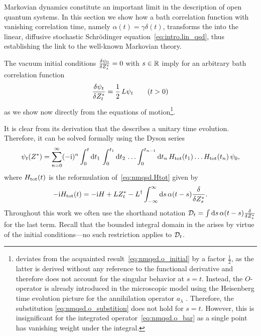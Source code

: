 Markovian dynamics constitute an important limit in the description of open quantum systems.
In this section we show how a bath correlation function with vanishing correlation time, namely $\alpha(t) = \gamma\delta(t)$, transforms the \NMSSE into the linear, diffusive stochastic Schrödinger equation~\ref{eq:intro.lin_qsd}, thus establishing the link to the well-known Markovian theory.

The vacuum initial conditions $\frac{\delta \psi_0}{\delta {Z}^*_s} = 0$ with $s \in \mathbb{R}$ imply for an arbitrary bath correlation function
\begin{equation}
  \frac{\delta \psi_t}{\delta {Z}^*_t} = \frac{1}{2} \, L \psi_t \qquad (t > 0)
  \label{eq:nmqsd.deriv_psit}
\end{equation}
as we show now directly from the equations of motion\footnote{%
   deviates from the acquainted result~\ref{eq:nmqsd.o_initial} by a factor $\frac{1}{2}$, as the latter is derived without any reference to the functional derivative and therefore does not account for the singular behavior at $s=t$.
  Instead, the $O$-operator is already introduced in the microscopic model using the Heisenberg time evolution picture for the annihilation operator $a_\lambda$ \cite{St01_habil}.
  Therefore, the substitution \autoref{eq:nmqsd.o_substition} does not hold for $s = t$.
  However, this is insignificant for the integrated operator~\ref{eq:nmqsd.o_bar} as a single point has vanishing weight under the integral.
}.

It is clear from its derivation that the \NMSSE describes a unitary time evolution.
Therefore, it can be solved formally using the Dyson series
\begin{equation}
  \psi_t(\ZZ) = \sum_{n=0}^\infty (-\ii)^n \intl{0}{t}{t_1} \intl{0}{t_1}{t_2} \dots \intl{0}{t_{n-1}}{t_n}  \Htot(t_1) \dots \Htot(t_n) \, \psi_0,
  \label{eq:nmqsd.dyson}
\end{equation}
where $H_\mathrm{tot}(t)$ is the reformulation of~\ref{eq:nmqsd.Htot} given by
\begin{equation}
  -\mathrm{i} H_\mathrm{tot}(t) = -\mathrm{i} H + L {Z}^*_t - L^\dagger \int_{-\infty}^{\infty}\mathrm{d}s\, \alpha(t-s) \frac{\delta}{\delta {Z}^*_s}.
  \label{eq:nmqsd.Htot_time}
\end{equation}
Throughout this work we often use the shorthand notation $\mathcal{D}_t = \int\mathrm{d}s \, \alpha(t-s) \frac{\delta}{\delta {Z}^*_s}$ for the last term.
Recall that the bounded integral domain in the \NMSSE arises by virtue of the initial conditions---no such restriction applies to $\mathcal{D}_t$.

